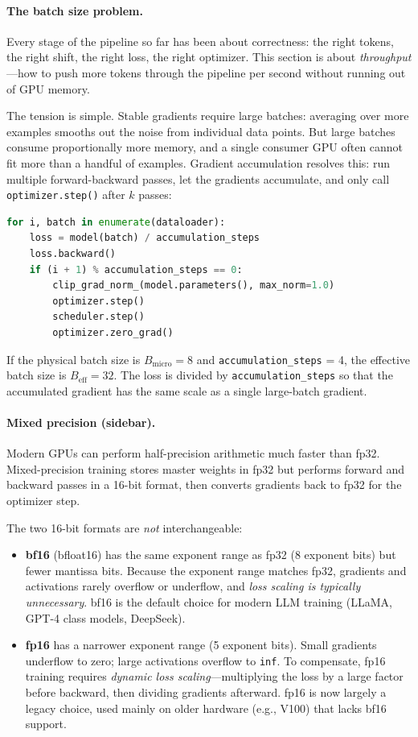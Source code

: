 \paragraph{The batch size problem.} Every stage of the pipeline so far has been about correctness: the right tokens, the right shift, the right loss, the right optimizer. This section is about \emph{throughput}---how to push more tokens through the pipeline per second without running out of GPU memory.

The tension is simple. Stable gradients require large batches: averaging over more examples smooths out the noise from individual data points. But large batches consume proportionally more memory, and a single consumer GPU often cannot fit more than a handful of examples. Gradient accumulation resolves this: run multiple forward-backward passes, let the gradients accumulate, and only call \texttt{optimizer.step()} after $k$ passes:

\begin{lstlisting}[language=Python, caption={Gradient accumulation.}]
for i, batch in enumerate(dataloader):
    loss = model(batch) / accumulation_steps
    loss.backward()
    if (i + 1) % accumulation_steps == 0:
        clip_grad_norm_(model.parameters(), max_norm=1.0)
        optimizer.step()
        scheduler.step()
        optimizer.zero_grad()
\end{lstlisting}

If the physical batch size is $B_{\text{micro}} = 8$ and \texttt{accumulation\_steps} = 4, the effective batch size is $B_{\text{eff}} = 32$. The loss is divided by \texttt{accumulation\_steps} so that the accumulated gradient has the same scale as a single large-batch gradient.

\paragraph{Mixed precision (sidebar).} Modern GPUs can perform half-precision arithmetic much faster than fp32. Mixed-precision training stores master weights in fp32 but performs forward and backward passes in a 16-bit format, then converts gradients back to fp32 for the optimizer step.

The two 16-bit formats are \emph{not} interchangeable:
\begin{itemize}[nosep]
  \item \textbf{bf16} (bfloat16) has the same exponent range as fp32 (8 exponent bits) but fewer mantissa bits. Because the exponent range matches fp32, gradients and activations rarely overflow or underflow, and \emph{loss scaling is typically unnecessary}. bf16 is the default choice for modern LLM training (LLaMA, GPT-4 class models, DeepSeek).
  \item \textbf{fp16} has a narrower exponent range (5 exponent bits). Small gradients underflow to zero; large activations overflow to \texttt{inf}. To compensate, fp16 training requires \emph{dynamic loss scaling}---multiplying the loss by a large factor before backward, then dividing gradients afterward. fp16 is now largely a legacy choice, used mainly on older hardware (e.g., V100) that lacks bf16 support.
\end{itemize}

